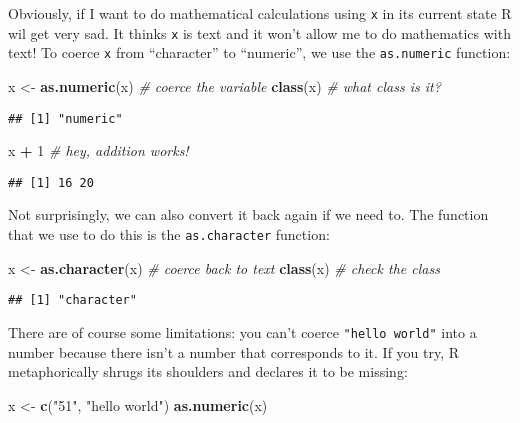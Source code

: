 \documentclass[]{book}
\newenvironment{Shaded}{\begin{snugshade}}{\end{snugshade}}
\newcommand{\CommentTok}[1]{\textcolor[rgb]{0.56,0.35,0.01}{\textit{#1}}}
\newcommand{\DecValTok}[1]{\textcolor[rgb]{0.00,0.00,0.81}{#1}}
\newcommand{\KeywordTok}[1]{\textcolor[rgb]{0.13,0.29,0.53}{\textbf{#1}}}
\newcommand{\NormalTok}[1]{#1}
\newcommand{\OperatorTok}[1]{\textcolor[rgb]{0.81,0.36,0.00}{\textbf{#1}}}
\newcommand{\StringTok}[1]{\textcolor[rgb]{0.31,0.60,0.02}{#1}}
\begin{document}
Obviously, if I want to do mathematical calculations using \texttt{x} in its current state R wil get very sad. It thinks \texttt{x} is text and it won't allow me to do mathematics with text! To coerce \texttt{x} from ``character'' to ``numeric'', we use the \texttt{as.numeric} function:

\begin{Shaded}
\begin{Highlighting}[]
\NormalTok{x <-}\StringTok{ }\KeywordTok{as.numeric}\NormalTok{(x)  }\CommentTok{# coerce the variable}
\KeywordTok{class}\NormalTok{(x)            }\CommentTok{# what class is it?}
\end{Highlighting}
\end{Shaded}

\begin{verbatim}
## [1] "numeric"
\end{verbatim}

\begin{Shaded}
\begin{Highlighting}[]
\NormalTok{x }\OperatorTok{+}\StringTok{ }\DecValTok{1}               \CommentTok{# hey, addition works!}
\end{Highlighting}
\end{Shaded}

\begin{verbatim}
## [1] 16 20
\end{verbatim}

Not surprisingly, we can also convert it back again if we need to. The function that we use to do this is the \texttt{as.character} function:

\begin{Shaded}
\begin{Highlighting}[]
\NormalTok{x <-}\StringTok{ }\KeywordTok{as.character}\NormalTok{(x)   }\CommentTok{# coerce back to text}
\KeywordTok{class}\NormalTok{(x)               }\CommentTok{# check the class}
\end{Highlighting}
\end{Shaded}

\begin{verbatim}
## [1] "character"
\end{verbatim}

There are of course some limitations: you can't coerce \texttt{"hello\ world"} into a number because there isn't a number that corresponds to it. If you try, R metaphorically shrugs its shoulders and declares it to be missing:

\begin{Shaded}
\begin{Highlighting}[]
\NormalTok{x <-}\StringTok{ }\KeywordTok{c}\NormalTok{(}\StringTok{"51"}\NormalTok{, }\StringTok{"hello world"}\NormalTok{)}
\KeywordTok{as.numeric}\NormalTok{(x)}
\end{Highlighting}
\end{Shaded}
\end{document}
